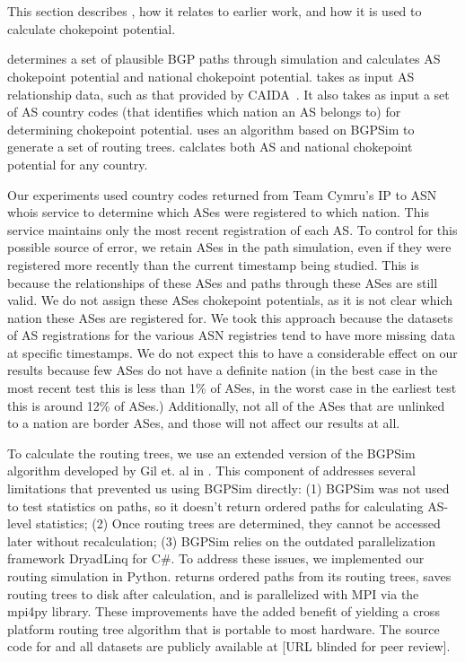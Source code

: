 
\section{\toolname}

This section describes \toolname{}, how it relates to earlier work, and how it is used to calculate chokepoint
potential.

\toolname{} determines a set of plausible BGP paths through simulation and calculates AS
chokepoint potential and national chokepoint potential.  \toolname{} takes as input AS relationship data, such as that provided by
CAIDA~\cite{CAIDA}.  It also takes as input a set of AS
country codes (that identifies which nation an AS belongs to) for
determining chokepoint potential.  \toolname{}
uses an algorithm based on BGPSim \cite{quicksand} to
generate a set of routing trees. \toolname{} 
calclates both AS and national chokepoint potential for any country.

Our experiments used country codes returned from Team Cymru's IP to
ASN whois service \cite{cymru} to determine which ASes were registered
to which nation.  This service maintains only the most recent
registration of each AS.  To control for this possible source of
error, we retain ASes in the path simulation, even if they were
registered more recently than the current timestamp being studied. This is because
the relationships of these ASes and paths through these ASes are still valid.
We do not assign these ASes chokepoint potentials, as it is not clear which nation
these ASes are registered for. We took this approach
because the datasets of AS registrations for the various ASN
registries tend to have more missing data at specific timestamps.
We do not expect this to have a considerable effect on our results
because few ASes do not have a definite nation (in the best case in the most recent
test this is less than 1\% of ASes, in the worst case in the earliest test this is around 12\% of ASes.)
Additionally, not all of the ASes that are unlinked to a nation are border ASes, and those will not
affect our results at all.

\par To calculate the routing trees, we use an extended version of the
BGPSim algorithm developed by Gil et. al in \cite{quicksand}. This
component of \toolname{} addresses several limitations that prevented
us using BGPSim directly: (1) BGPSim was not used to test statistics on paths, so it
doesn't return ordered paths for calculating AS-level statistics; (2)
Once routing trees are determined, they cannot be accessed later
without recalculation; (3) BGPSim relies on the outdated
parallelization framework DryadLinq for C\#. To address these issues,
we implemented our routing simulation in
Python. \toolname{} returns
ordered paths from its routing trees, saves routing trees to disk
after calculation, and is parallelized with MPI via the mpi4py
library. These improvements have the added benefit of yielding a cross
platform routing tree algorithm that is portable to most
hardware. The source code for \toolname{} and all datasets are publicly available at [URL blinded for peer review].


